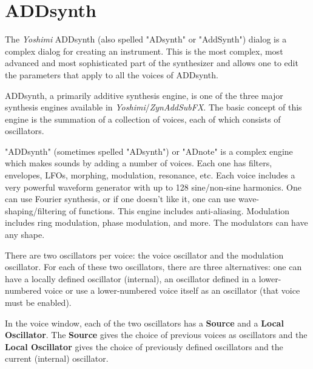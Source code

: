 %
%
%

\section{ADDsynth}
\label{sec:addsynth}

   The \textsl{Yoshimi} ADDsynth (also spelled "ADsynth" or "AddSynth")
   dialog is a complex dialog for creating an
   instrument.  This is the most complex, most advanced and most
   sophisticated part of the synthesizer and allows one to edit the
   parameters that apply to all the voices of ADDsynth.

   ADDsynth, a primarily additive synthesis engine, is one of the three major
   synthesis engines available in \textsl{Yoshimi}/\textsl{ZynAddSubFX}.
   The basic concept of this engine is the summation of a collection of voices,
   each of which consists of oscillators.

   "ADDsynth" (sometimes spelled "ADsynth") or "ADnote" is a complex engine
   which makes sounds by adding a number of voices. Each one has filters,
   envelopes, LFOs, morphing, modulation, resonance, etc.
   Each voice includes a very powerful
   waveform generator with up to 128 sine/non-sine harmonics. One can use
   Fourier synthesis, or if one doesn't like it, one can use
   wave-shaping/filtering of functions. This engine includes anti-aliasing.
   Modulation includes ring modulation, phase modulation, and more.
   The modulators can have any shape.
   \cite{zyndoc}

   There are two oscillators per voice: the  voice
   oscillator and the  modulation oscillator. For
   each of these two oscillators, there are three alternatives: one can have a
   locally defined oscillator (internal), an oscillator defined in a
   lower-numbered voice or use a lower-numbered voice itself as an oscillator
   (that voice must be enabled).

   In the voice window, each of the two oscillators has a \textbf{Source} and a
   \textbf{Local Oscillator}. The \textbf{Source} gives the choice of previous
   voices as oscillators and the \textbf{Local Oscillator} gives the choice
   of previously defined oscillators and the current (internal) oscillator.

